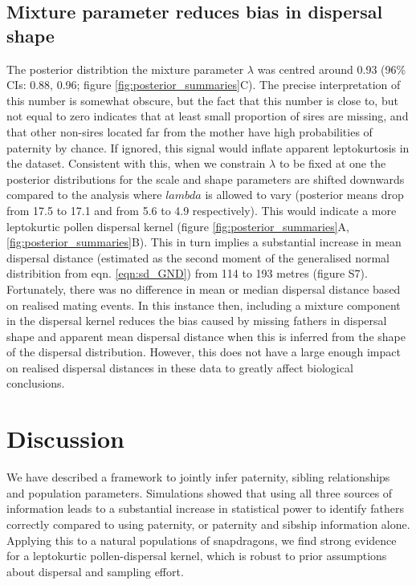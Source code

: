 \documentclass[10pt, a4paper, twocolumn]{article} %
\begin{document}
\subsection{Mixture parameter reduces bias in dispersal shape}

The posterior distribtion the mixture parameter $\lambda$ was centred around 0.93 (96\% CIs: 0.88, 0.96; figure \ref{fig:posterior_summaries}C).
The precise interpretation of this number is somewhat obscure, but the fact that this number is close to, but not equal to zero indicates that at least small proportion of sires are missing, and that other non-sires located far from the mother have high probabilities of paternity by chance.
If ignored, this signal would inflate apparent leptokurtosis in the dataset.
Consistent with this, when we constrain $\lambda$ to be fixed at one the posterior distributions for the scale and shape parameters are shifted downwards compared to the analysis where $lambda$ is allowed to vary (posterior means drop from 17.5 to 17.1 and from 5.6 to 4.9 respectively).
This would indicate a more leptokurtic pollen dispersal kernel (figure \ref{fig:posterior_summaries}A, \ref{fig:posterior_summaries}B).
This in turn implies a substantial increase in mean dispersal distance (estimated as the second moment of the generalised normal distribition from eqn. \ref{eqn:sd_GND}) from 114 to 193 metres (figure S7).
Fortunately, there was no difference in mean or median dispersal distance based on realised mating events.
In this instance then, including a mixture component in the dispersal kernel reduces the bias caused by missing fathers in dispersal shape and apparent mean dispersal distance when this is inferred from the shape of the dispersal distribution.
However, this does not have a large enough impact on realised dispersal distances in these data to greatly affect biological conclusions.

\section{Discussion}

We have described a framework to jointly infer paternity, sibling relationships and population parameters. Simulations showed that using all three sources of information leads to a substantial increase in statistical power to identify fathers correctly compared to using paternity, or paternity and sibship information alone. Applying this to a natural populations of snapdragons, we find strong evidence for a leptokurtic pollen-dispersal kernel, which is robust to prior assumptions about dispersal and sampling effort.
\end{document}
